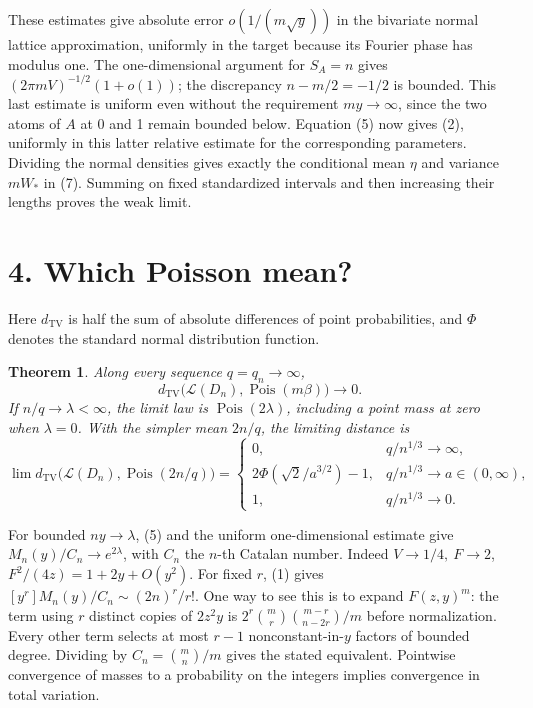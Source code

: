\documentclass[11pt,letterpaper]{article}
\newcommand{\Poi}{\operatorname{Pois}}
\newcommand{\TV}{d_{\mathrm{TV}}}
\newtheorem{theorem}{Theorem}
\begin{document}
These estimates give absolute error \(o(1/(m\sqrt y))\) in the
bivariate normal lattice approximation, uniformly in the target
because its Fourier phase has modulus one. The one-dimensional
argument for \(S_A=n\) gives \((2\pi mV)^{-1/2}(1+o(1))\);
the discrepancy \(n-m/2=-1/2\) is bounded. This last estimate
is uniform even without the requirement \(my\to\infty\), since
the two atoms of \(A\) at 0 and 1 remain bounded below.
Equation (5) now gives (2), uniformly in this latter relative
estimate for the corresponding parameters. Dividing the normal
densities gives exactly the conditional mean \(\eta\) and variance
\(mW_*\) in (7). Summing on fixed standardized intervals and
then increasing their lengths proves the weak limit.

\section*{4. Which Poisson mean?}
Here \(\TV\) is half the sum of absolute differences of point
probabilities, and \(\Phi\) denotes the standard normal distribution
function.
\begin{theorem}
Along every sequence \(q=q_n\to\infty\),
\[
 \TV\big(\mathcal L(D_n),\Poi(m\beta)\big)\longrightarrow0.
\]
If \(n/q\to\lambda<\infty\), the limit law is \(\Poi(2\lambda)\),
including a point mass at zero when \(\lambda=0\). With the
simpler mean \(2n/q\), the limiting distance is
\[
 \lim\TV\big(\mathcal L(D_n),\Poi(2n/q)\big)=
 \begin{cases}
 0, & q/n^{1/3}\to\infty,\\
 2\Phi(\sqrt2/a^{3/2})-1,& q/n^{1/3}\to a\in(0,\infty),\\
 1,& q/n^{1/3}\to0.
 \end{cases}
 \tag{8}
\]
\end{theorem}
For bounded \(ny\to\lambda\), (5) and the uniform one-dimensional
estimate give \(M_n(y)/C_n\to e^{2\lambda}\), with \(C_n\) the
\(n\)-th Catalan number. Indeed \(V\to1/4,\ F\to2\),
\(F^2/(4z)=1+2y+O(y^2)\). For fixed \(r\), (1) gives
\([y^r]M_n(y)/C_n\sim(2n)^r/r!\). One way to see this is to expand
\(F(z,y)^m\): the term using \(r\) distinct copies of \(2z^2y\)
is \(2^r\binom mr\binom{m-r}{n-2r}/m\) before normalization.
Every other term selects at most \(r-1\) nonconstant-in-\(y\)
factors of bounded degree. Dividing by \(C_n=\binom{m}{n}/m\)
gives the stated equivalent. Pointwise convergence of masses to a
probability on the integers implies convergence in total variation.
\end{document}
